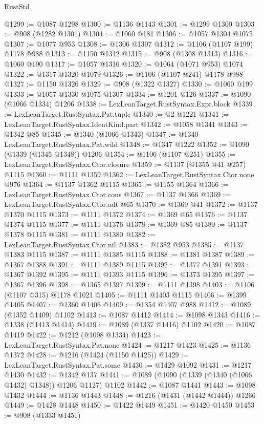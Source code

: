 \begin{lexlean}{RustStd}
\begin{coremodule}
@1299 := @1087 @1298
@1300 := @1136 @1143
@1301 := @1299 @1300
@1303 := @908 (@1282 @1301)
@1304 := @1060 @181
@1306 := @1057 @1304 @1075
@1307 := @1077 @953
@1308 := @1306 @1307
@1312 := @1106 (@1107 @199) @1178 @988
@1313 := @1150 @1312
@1315 := @908 (@1308 @1313)
@1316 := @1060 @190
@1317 := @1057 @1316
@1320 := @1064 (@1071 @953) @1074
@1322 := @1317 @1320 @1079
@1326 := @1106 (@1107 @241) @1178 @988
@1327 := @1150 @1326
@1329 := @908 (@1322 @1327)
@1330 := @1060 @199
@1333 := @1057 @1330 @1075 @1307
@1334 := @1201 @126
@1337 := @1090 (@1066 @1334) @1206
@1338 := LexLeanTarget.RustSyntax.Expr.block
@1339 := LexLeanTarget.RustSyntax.Pat.tuple
@1340 := @2 @1221
@1341 := LexLeanTarget.RustSyntax.IdentKind.part
@1342 := @1058 @1341
@1343 := @1342 @85
@1345 := @1340 (@1066 @1343)
@1347 := @1340 LexLeanTarget.RustSyntax.Pat.wild
@1348 := @1347 @1222
@1352 := @1090 (@1339 (@1345 @1348)) @1206
@1354 := @1106 (@1107 @251)
@1355 := LexLeanTarget.RustSyntax.Ctor.closure
@1359 := @1137 (@1355 @41 @257) @1115
@1360 := @1111 @1359
@1362 := LexLeanTarget.RustSyntax.Ctor.none @976
@1364 := @1137 @1362 @1115
@1365 := @1155 @1364
@1366 := LexLeanTarget.RustSyntax.Ctor.cons
@1367 := @1137 @1366
@1369 := LexLeanTarget.RustSyntax.Ctor.adt @65
@1370 := @1369 @41
@1372 := @1137 @1370 @1115
@1373 := @1111 @1372
@1374 := @1369 @65
@1376 := @1137 @1374 @1115
@1377 := @1111 @1376
@1378 := @1369 @85
@1380 := @1137 @1378 @1115
@1381 := @1111 @1380
@1382 := LexLeanTarget.RustSyntax.Ctor.nil
@1383 := @1382 @953
@1385 := @1137 @1383 @1115
@1387 := @1111 @1385 @1115
@1388 := @1381 @1387
@1389 := @1367 @1388
@1391 := @1111 @1389 @1115
@1392 := @1377 @1391
@1393 := @1367 @1392
@1395 := @1111 @1393 @1115
@1396 := @1373 @1395
@1397 := @1367 @1396
@1398 := @1365 @1397
@1399 := @1111 @1398
@1403 := @1106 (@1107 @315) @1178 @1021
@1405 := @1111 @1403 @1115
@1406 := @1399 @1405
@1407 := @1360 @1406
@1409 := @1354 @1407 @988
@1412 := @1089 (@1352 @1409) @1102
@1413 := @1087 @1412
@1414 := @1098 @1343
@1416 := @1338 (@1413 @1414)
@1419 := @1089 (@1337 @1416) @1102
@1420 := @1087 @1419
@1422 := @1212 (@1098 @1334)
@1423 := LexLeanTarget.RustSyntax.Pat.none
@1424 := @1217 @1423
@1425 := @1136 @1372
@1428 := @1216 (@1424 (@1150 @1425))
@1429 := LexLeanTarget.RustSyntax.Pat.some
@1430 := @1429 @1092
@1431 := @1217 @1430
@1432 := @1342 @137
@1441 := @1089 (@1090 (@1339 (@1340 (@1066 @1432) @1348)) @1206 @1127) @1102
@1442 := @1087 @1441
@1443 := @1098 @1432
@1444 := @1136 @1443
@1448 := @1216 (@1431 (@1442 @1444)) @1266
@1449 := @1428 @1448
@1450 := @1422 @1449
@1451 := @1420 @1450
@1453 := @908 (@1333 @1451)

\end{coremodule}
\end{lexlean}
